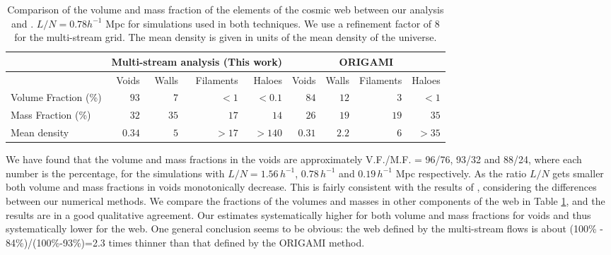  \begin{table}
  \caption{Comparison of the volume and mass fraction of the elements of the cosmic web between our analysis and \citet{Falck2015}. $ L/N = 0.78 h^{-1}$ Mpc for simulations used in both techniques. We use a refinement factor of 8 for the multi-stream grid. The mean density is given in units of the mean density of the universe. }
\begin{tabular}{|l|r|r|r|r|r|r|r|r|}
\hline
\multicolumn{1}{|c|}{} & \multicolumn{4}{l|}{Multi-stream analysis (This work)} & \multicolumn{4}{c|}{ORIGAMI \citep{Falck2015}}    \\ \hline
                       & Voids & Walls & Filaments & Haloes  & Voids & Walls & Filaments & Haloes \\ \hline
Volume Fraction (\%)                 & $93$   & $7$    & $< 1$      & $< 0.1$ & $84$   & $12$   & $3$        & $< 1$  \\ \hline
Mass Fraction   (\%)               & $32$   & $35$   & $17$       & $14$    & $26$   & $19$   & $19$       & $35$   \\ \hline
Mean density                    & $0.34$ & $5$    & $>17$      & $>140$  & $0.31$ & $2.2$  & $6$        & $>35$  \\ \hline
\end{tabular}
 \label{tab:Compare}
\end{table}

We have found that the volume and mass fractions in the voids  are approximately V.F./M.F. = 96/76, 93/32  and 88/24, where each number
is the percentage, for the simulations with  $L/N = 1.56 \,h^{-1}$, $0.78 \,h^{-1}$  and $0.19 \,h^{-1}$ Mpc respectively. As the ratio $L/N$ 
gets smaller both volume and mass fractions in  voids monotonically decrease.  
This is fairly consistent with the results of \citet{Falck2015}, considering the differences between our numerical methods. We compare the fractions of the volumes and masses
in other components of the web in Table \ref{tab:Compare}, and the results are in a good qualitative agreement.
Our estimates systematically higher for both volume and mass fractions for voids and thus systematically lower for the web. 
One general conclusion seems to be obvious: the web defined by the multi-stream flows is about  (100\% - 84\%)/(100\%-93\%)=2.3  times  thinner than that defined by the ORIGAMI  method. 


